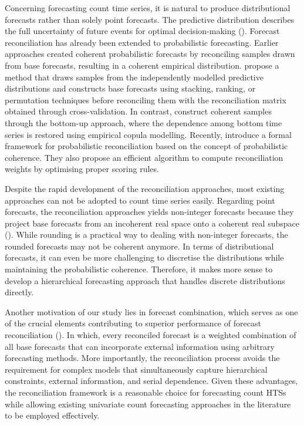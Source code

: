 \documentclass[a4paper,review,12pt,authoryear]{elsarticle}
\theoremstyle{definition}
\begin{document}
Concerning forecasting count time series, it is natural to produce distributional forecasts rather than solely point forecasts.
The predictive distribution describes the full uncertainty of future events for optimal decision-making (\citealp{gneitingProbabilisticForecasting2014}).
Forecast reconciliation has already been extended to probabilistic forecasting.
Earlier approaches created coherent probabilistic forecasts by reconciling samples drawn from base forecasts, resulting in a coherent empirical distribution.
\cite{jeonProbabilisticForecastReconciliation2019} propose a method that draws samples from the independently modelled predictive distributions and constructs base forecasts using stacking, ranking, or permutation techniques before reconciling them with the reconciliation matrix obtained through cross-validation.
In contrast, \cite{bentaiebHierarchicalProbabilisticForecasting2020} construct coherent samples through the bottom-up approach,
where the dependence among bottom time series is restored using empirical copula modelling.
Recently, \cite{panagiotelisProbabilisticForecastReconciliation2022} introduce a formal framework for probabilistic reconciliation based on the concept of probabilistic coherence.
They also propose an efficient algorithm to compute reconciliation weights by optimising proper scoring rules.


Despite the rapid development of the reconciliation approaches, most existing approaches can not be adopted to count time series easily.
Regarding point forecasts, the reconciliation approaches yields non-integer forecasts because they project base forecasts from an incoherent real space onto a coherent real subspace (\citealp{panagiotelisForecastReconciliationGeometric2021}).
While rounding is a practical way to dealing with non-integer forecasts, the rounded forecasts may not be coherent anymore.
In terms of distributional forecasts, it can even be more challenging to discretise the distributions while maintaining the probabilistic coherence.
Therefore, it makes more sense to develop a hierarchical forecasting approach that handles discrete distributions directly.

Another motivation of our study lies in forecast combination, which serves as one of the crucial elements contributing to superior performance of forecast reconciliation (\citealp{hollymanUnderstandingForecastReconciliation2021}).
In which, every reconciled forecast is a weighted combination of all base forecasts that can incorporate external information using arbitrary forecasting methods.
More importantly, the reconciliation process avoids the requirement for complex models that simultaneously capture hierarchical constraints, external information, and serial dependence.
Given these advantages, the reconciliation framework is a reasonable choice for forecasting count HTSs while allowing existing univariate count forecasting approaches in the literature to be employed effectively.
\end{document}

